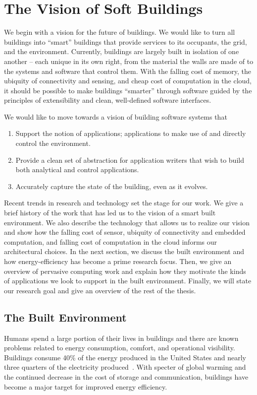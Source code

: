 \chapter{The Vision of Soft Buildings}

We begin with a vision for the future of buildings.  We would like to turn all buildings into ``smart''
buildings that provide services to its occupants, the grid, and the environment.  Currently, buildings
are largely built in isolation of one another -- each unique in its own right, from the material the walls
are made of to the systems and software that control them.  With the falling cost of memory, the ubiquity of
connectivity and sensing, and cheap cost of computation in the cloud, it should be possible to make buildings ``smarter''
through software guided by the principles of extensibility and clean, well-defined software interfaces.

We would like to move towards a vision of building software systems that

\begin{enumerate}
\item Support the notion of applications; applications to make use of and directly control the environment.
\item Provide a clean set of abstraction for application writers that wish to build both analytical and control
applications.
\item Accurately capture the state of the building, even as it evolves.
\end{enumerate}


Recent trends in research and technology set the stage for our work.  We give a brief history of the work that has 
led us to the vision of a smart built environment.  We also describe the technology that
allows us to realize our vision and show how the falling cost of sensor, ubiquity of connectivity and embedded computation,
and falling cost of computation in the cloud informs our architectural choices.
In the next section, 
we discuss the built environment and how energy-efficiency has become a prime research focus.
Then, we give an overview of pervasive computing work and explain how they motivate the kinds of applications we look 
to support in the built environment.  Finally, we will state our research goal and give an overview of the rest
of the thesis.




\section{The Built Environment}
Humans spend a large portion of their lives in buildings and
there are known problems related to energy consumption, comfort, and operational visibility.  
Buildings consume 40\% of the energy produced in the United States and nearly three quarters of 
the electricity produced~\cite{epabuildings}.  With specter of global warming and the continued decrease in the cost of storage and 
communication, buildings have become a major target for improved energy efficiency.

